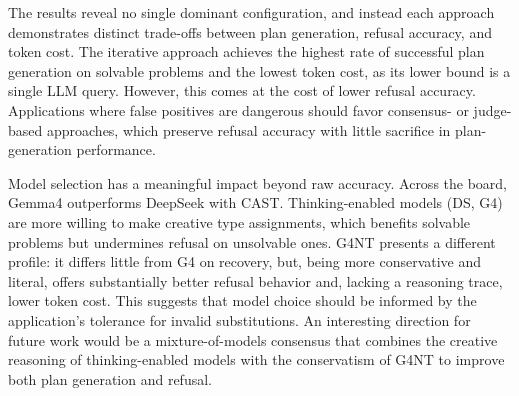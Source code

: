 
The results reveal no single dominant configuration, and instead each approach demonstrates distinct trade-offs between plan generation, refusal accuracy, and token cost. The iterative approach achieves the highest rate of successful plan generation on solvable problems and the lowest token cost, as its lower bound is a single LLM query. However, this comes at the cost of lower refusal accuracy. Applications where false positives are dangerous should favor consensus- or judge-based approaches, which preserve refusal accuracy with little sacrifice in plan-generation performance.


Model selection has a meaningful impact beyond raw accuracy. Across the board, Gemma4 outperforms DeepSeek with CAST. Thinking-enabled models (\textsc{DS}, \textsc{G4}) are more willing to make creative type assignments, which benefits solvable problems but undermines refusal on unsolvable ones. \textsc{G4NT} presents a different profile: it differs little from \textsc{G4} on recovery, but, being more conservative and literal, offers substantially better refusal behavior and, lacking a reasoning trace, lower token cost. This suggests that model choice should be informed by the application's tolerance for invalid substitutions. An interesting direction for future work would be a mixture-of-models consensus that combines the creative reasoning of thinking-enabled models with the conservatism of \textsc{G4NT} to improve both plan generation and refusal.
